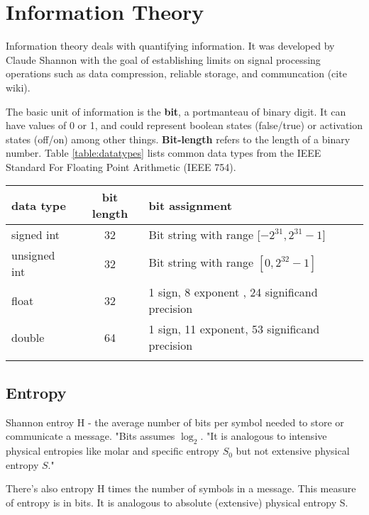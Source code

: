 \section{Information Theory}

Information theory deals with quantifying information. It was developed by Claude Shannon with the goal of establishing limits on signal processing operations such as data compression, reliable storage, and communcation (cite wiki). 

The basic unit of information is the \textbf{bit}, a portmanteau of binary digit. It can have values of 0 or 1, and could represent boolean states (false/true) or activation states (off/on) among other things. \textbf{Bit-length} refers to the length of a binary number. Table \ref{table:datatypes} lists common data types from the IEEE Standard For Floating Point Arithmetic (IEEE 754). 

\begin{tabular}{ l | c | l }
data type & bit length & bit assignment \\
\hline
signed int & 32 & Bit string with range [$-2^{31}, 2^{31}-1]$ \\
unsigned int & 32 & Bit string with range $[0, 2^{32}-1]$ \\
float & 32 & 1 sign, 8 exponent , 24 significand precision \\
double & 64 & 1 sign, 11 exponent, 53 significand precision \\ 
\label{table:datatypes}
\end{tabular}

\subsection{Entropy}

Shannon entroy H - the average number of bits per symbol needed to store or communicate a message. "Bits assumes $\log_{2}$. "It is analogous to intensive physical entropies like molar and specific entropy $S_{0}$ but not extensive physical entropy $S$."

There's also entropy H times the number of symbols in a message. This measure of entropy is in bits. It is analogous to absolute (extensive) physical entropy S. 

